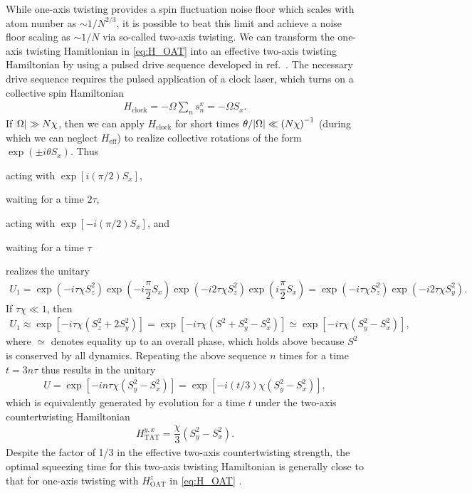 \documentclass[aps,notitlepage,nofootinbib,11pt]{revtex4-1}
\renewcommand{\t}{\text} %
\newcommand{\f}[2]{\dfrac{#1}{#2}} %
\newcommand{\p}[1]{\left(#1\right)} %
\renewcommand{\sp}[1]{\left[#1\right]} %
\newcommand{\1}{\mathds{1}}
\begin{document}
While one-axis twisting provides a spin fluctuation noise floor which
scales with atom number as $\sim1/N^{2/3}$, it is possible to beat
this limit and achieve a noise floor scaling as $\sim1/N$ via
so-called two-axis twisting.  We can transform the one-axis twisting
Hamitlonian in \eqref{eq:H_OAT} into an effective two-axis twisting
Hamiltonian by using a pulsed drive sequence developed in
ref.~\cite{liu2011spin}.  The necessary drive sequence requires the
pulsed application of a clock laser, which turns on a collective spin
Hamiltonian
\begin{align}
  H_{\t{clock}} = -\Omega \sum_n s_n^x = -\Omega S_x.
\end{align}
If $\abs{\Omega}\gg N\chi$, then we can apply $H_{\t{clock}}$ for
short times $\theta/\abs{\Omega}\ll\p{N\chi}^{-1}$ (during which we
can neglect $H_{\t{eff}}$) to realize collective rotations of the form
$\exp\p{\pm i\theta S_x}$.  Thus
\begin{enumerate*}[label=(\roman*)]
\item acting with $\exp\sp{i\p{\pi/2}S_x}$,
\item waiting for a time $2\tau$,
\item acting with $\exp\sp{-i\p{\pi/2}S_x}$, and
\item waiting for a time $\tau$
\end{enumerate*}
realizes the unitary
\begin{align}
  U_1 = \exp\p{-i\tau\chi S_z^2} \exp\p{-i\f{\pi}{2}S_x}
  \exp\p{-i2\tau\chi S_z^2} \exp\p{i\f{\pi}{2}S_x}
  = \exp\p{-i\tau\chi S_z^2} \exp\p{-i2\tau\chi S_y^2}.
\end{align}
If $\tau\chi\ll1$, then
\begin{align}
  U_1 \approx \exp\sp{-i\tau\chi\p{S_z^2 + 2S_y^2}}
  = \exp\sp{-i\tau\chi\p{S^2 + S_y^2 - S_x^2}}
  \simeq \exp\sp{-i\tau\chi\p{S_y^2 - S_x^2}},
\end{align}
where $\simeq$ denotes equality up to an overall phase, which holds
above because $S^2$ is conserved by all dynamics.  Repeating the above
sequence $n$ times for a time $t=3n\tau$ thus results in the unitary
\begin{align}
  U = \exp\sp{-in\tau\chi\p{S_y^2 - S_x^2}}
  = \exp\sp{-i\p{t/3}\chi\p{S_y^2 - S_x^2}},
\end{align}
which is equivalently generated by evolution for a time $t$ under the
two-axis countertwisting Hamiltonian
\begin{align}
  H_{\t{TAT}}^{y,x} = \f{\chi}{3}\p{S_y^2 - S_x^2}.
  \label{eq:H_TAT_pulse}
\end{align}
Despite the factor of 1/3 in the effective two-axis countertwisting
strength, the optimal squeezing time for this two-axis twisting
Hamiltonian is generally close to that for one-axis twisting with
$H_{\t{OAT}}^z$ in \eqref{eq:H_OAT} \cite{liu2011spin}.
\end{document}
